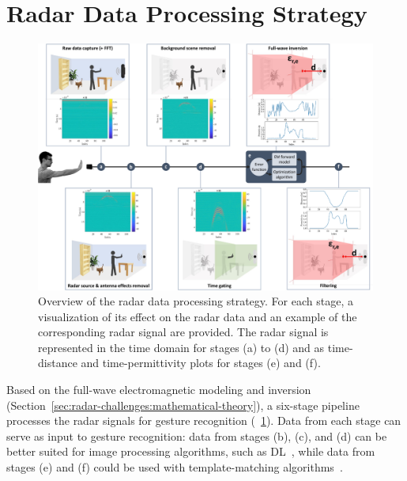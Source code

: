 \section{Radar Data Processing Strategy} \label{sec:radar-challenges:processing-strategy}

\begin{figure}[!b]
\centering
\includegraphics[width=\linewidth,trim={0 0 0.3cm 0},clip]{Figures/RadarChallenges/Pipeline/pipeline-detailed.pdf}
\caption{Overview of the radar data processing strategy. For each stage, a visualization of its effect on the radar data and an example of the corresponding radar signal are provided. The radar signal is represented in the time domain for stages (a) to (d) and as time-distance and time-permittivity plots for stages (e) and (f).}
\label{fig:radar-challenges:pipeline}
\vspace{-12pt}
\end{figure}

Based on the full-wave electromagnetic modeling and inversion (Section~\ref{sec:radar-challenges:mathematical-theory}), a six-stage pipeline processes the radar signals for gesture recognition (\fig~\ref{fig:radar-challenges:pipeline}). Data from each stage can serve as input to gesture recognition: data from stages (b), (c), and (d) can be better suited for image processing algorithms, such as DL~\cite{Skaria:2019}, while data from stages (e) and (f) could be used with template-matching algorithms~\cite{Ousmer:2020}.

